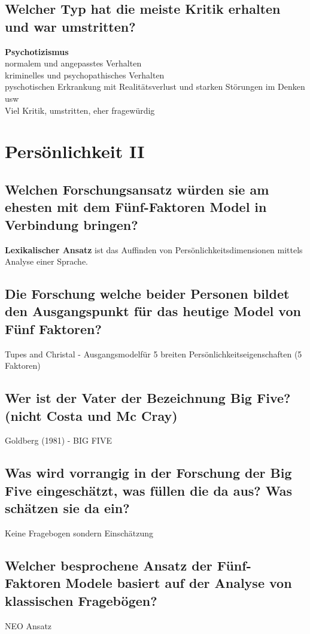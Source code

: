 \documentclass[a6paper,10pt,DIV=40]{scrartcl}
\begin{document}
\subsection{Welcher Typ hat die meiste Kritik erhalten und war umstritten?}
    \textbf{Psychotizismus}\\
    normalem und angepasstes Verhalten\\
    kriminelles und psychopathisches Verhalten\\
    pyschotischen Erkrankung mit Realitätsverlust und starken Störungen im Denken usw\\
    Viel Kritik, umstritten, eher fragewürdig

\section{Persönlichkeit II}

\subsection{Welchen Forschungsansatz würden sie am ehesten mit dem Fünf-Faktoren Model in Verbindung bringen?}
    \textbf{Lexikalischer Ansatz} ist das Auffinden von Persönlichkeitsdimensionen mittels Analyse einer Sprache.
\subsection{Die Forschung welche beider Personen bildet den Ausgangspunkt für das heutige Model von Fünf Faktoren?}
    Tupes and Christal - Ausgangsmodelfür 5 breiten Persönlichkeitseigenschaften (5 Faktoren)
\subsection{Wer ist der Vater der Bezeichnung Big Five? (nicht Costa und Mc Cray)}
    Goldberg (1981) - BIG FIVE
\subsection{Was wird vorrangig in der Forschung der Big Five eingeschätzt, was füllen die da aus? Was schätzen sie da ein?}
    Keine Fragebogen sondern Einschätzung
\subsection{Welcher besprochene Ansatz der Fünf-Faktoren Modele basiert auf der Analyse von klassischen Fragebögen?}
    NEO Ansatz
\end{document}
